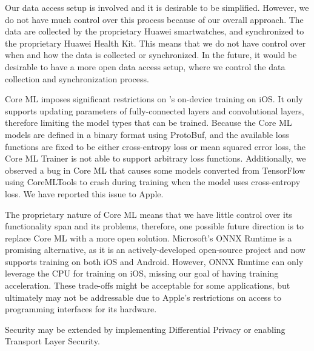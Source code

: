 Our data access setup is involved and it is desirable to be simplified.
However, we do not have much control over this process because of
our overall approach.
The data are collected by the proprietary Huawei smartwatches,
and synchronized to the proprietary Huawei Health Kit.
This means that we do not have control over when and how the data is
collected or synchronized.
In the future, it would be desirable to have a more open data access setup,
where we control the data collection and synchronization process.

Core ML imposes significant restrictions on \fedkit's on-device training on iOS.
It only supports updating parameters of fully-connected layers and convolutional
layers, therefore limiting the model types that can be trained.
Because the Core ML models are defined in a binary format using ProtoBuf,
and the available loss functions are fixed to be either cross-entropy loss or
mean squared error loss, the Core ML Trainer is not able to support arbitrary
loss functions.
Additionally, we observed a bug in Core ML that causes some models converted
from TensorFlow using CoreMLTools to crash during training when the model uses
cross-entropy loss.
We have reported this issue to Apple.

The proprietary nature of Core ML means that we have little control over its
functionality span and its problems, therefore,
one possible future direction is to replace Core ML with a more open solution.
Microsoft's ONNX Runtime is a promising alternative,
as it is an actively-developed open-source project and now supports training on
both iOS and Android.
However, ONNX Runtime can only leverage the CPU for training on iOS,
missing our goal of having training acceleration.
These trade-offs might be acceptable for some applications,
but ultimately may not be addressable due to Apple's restrictions on access to
programming interfaces for its hardware.

Security may be extended by implementing Differential Privacy or
enabling Transport Layer Security.
